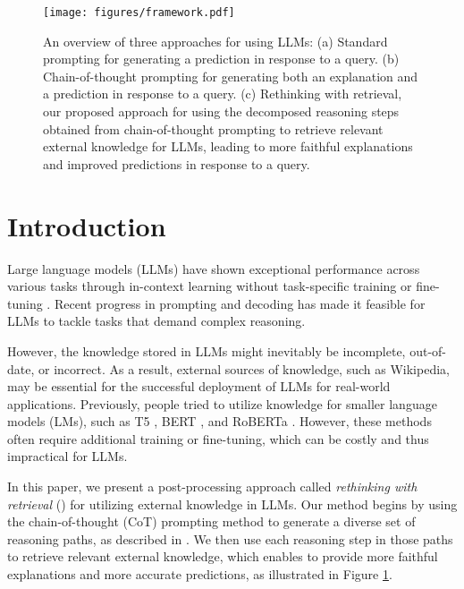 \begin{figure}
	\centering
	\texttt{[image: figures/framework.pdf]}
    \caption{An overview of three approaches for using LLMs: (a) Standard prompting for generating a prediction in response to a query. (b) Chain-of-thought prompting for generating both an explanation and a prediction in response to a query. (c)  Rethinking with retrieval, our proposed approach for using the decomposed reasoning steps obtained from chain-of-thought prompting to retrieve relevant external knowledge for LLMs, leading to more faithful explanations and improved predictions in response to a query.}
	\label{fig:framework}
\end{figure}
\section{Introduction}

Large language models (LLMs) have shown exceptional performance across various tasks through in-context learning without task-specific training or fine-tuning \cite{brown2020language, chowdhery2022palm, zhang2022opt, ouyang2022training}. Recent progress in prompting \cite{wei2022chain, zhou2022least, kojima2022large} and decoding \cite{wang2022self} has made it feasible for LLMs to tackle tasks that demand complex reasoning. 

However, the knowledge stored in LLMs might inevitably be incomplete, out-of-date, or incorrect. As a result, external sources of knowledge, such as Wikipedia, may be essential for the successful deployment of LLMs for real-world applications. Previously, people tried to utilize knowledge for smaller language models (LMs), such as T5 \cite{raffel2020exploring}, BERT \cite{devlin2019bert}, and RoBERTa \cite{liu2019roberta}. However, these methods often require additional training or fine-tuning, which can be costly and thus impractical for LLMs. 

In this paper, we present a post-processing approach called \textit{rethinking with retrieval} (\NAME{}) for utilizing external knowledge in LLMs. Our method begins by using the chain-of-thought (CoT) prompting method \cite{wei2022chain} to generate a diverse set of reasoning paths, as described in \citet{wang2022self}. We then use each reasoning step in those paths to retrieve relevant external knowledge, which enables \NAME{} to provide more faithful explanations and more accurate predictions, as illustrated in Figure \ref{fig:framework}.

